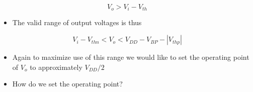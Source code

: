 \documentclass[11pt]{article}
\providecommand{\tightlist}{%
      \setlength{\itemsep}{0pt}\setlength{\parskip}{0pt}}
\begin{document}
\begin{equation}
V_o > V_i - V_{th}
\end{equation}

\begin{itemize}
\tightlist
\item
  The valid range of output voltages is thus
\end{itemize}

\begin{equation}
V_i - V_{thn} < V_o < V_{DD} - V_{BP} - |V_{thp}|
\end{equation}

\begin{itemize}
\tightlist
\item
  Again to maximize use of this range we would like to set the operating
  point of \(V_o\) to approximately \(V_{DD}/2\)
\item
  How do we set the operating point?
\end{itemize}
\end{document}
